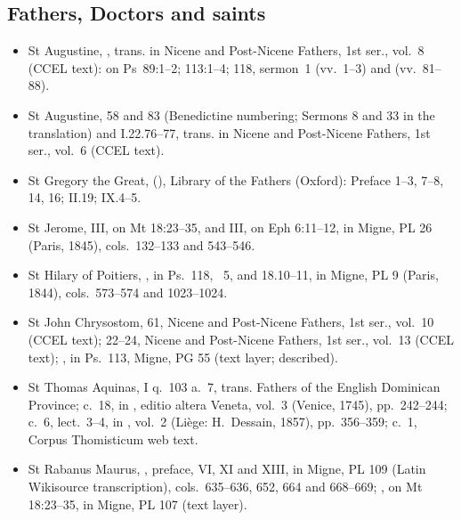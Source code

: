 {\subsection*{Fathers, Doctors and saints}
\begin{itemize}
\item St Augustine, , trans. in Nicene and Post-Nicene Fathers, 1st ser., vol.~8 (CCEL text): on Ps~89:1--2; 113:1--4; 118, sermon~1 (vv.~1--3) and  (vv.~81--88).
\item St Augustine,  58 and 83 (Benedictine numbering; Sermons 8 and 33 in the translation) and  I.22.76--77, trans. in Nicene and Post-Nicene Fathers, 1st ser., vol.~6 (CCEL text).
\item St Gregory the Great,  (), Library of the Fathers (Oxford): Preface 1--3, 7--8, 14, 16; II.19; IX.4--5.
\item St Jerome,  III, on Mt 18:23--35, and  III, on Eph 6:11--12, in Migne, PL 26 (Paris, 1845), cols.~132--133 and 543--546.
\item St Hilary of Poitiers, , in Ps.~118, ~5, and  18.10--11, in Migne, PL 9 (Paris, 1844), cols.~573--574 and 1023--1024.
\item St John Chrysostom,  61, Nicene and Post-Nicene Fathers, 1st ser., vol.~10 (CCEL text);  22--24, Nicene and Post-Nicene Fathers, 1st ser., vol.~13 (CCEL text); , in Ps.~113, Migne, PG 55 (text layer; described).
\item St Thomas Aquinas,  I q.~103 a.~7, trans. Fathers of the English Dominican Province;  c.~18, in , editio altera Veneta, vol.~3 (Venice, 1745), pp.~242--244;  c.~6, lect.~3--4, in , vol.~2 (Li\`ege: H.~Dessain, 1857), pp.~356--359;  c.~1, Corpus Thomisticum web text.
\item St Rabanus Maurus, , preface, VI, XI and XIII, in Migne, PL 109 (Latin Wikisource transcription), cols.~635--636, 652, 664 and 668--669; , on Mt 18:23--35, in Migne, PL 107 (text layer).

\end{itemize}}

